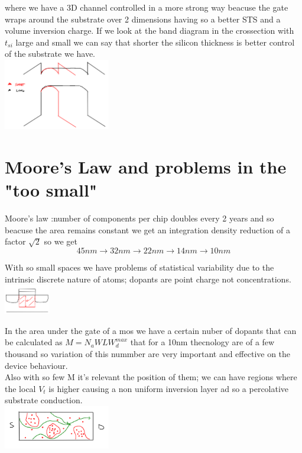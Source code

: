 where we have a 3D channel controlled in a more strong way beacuse the gate wraps around the substrate over 2 dimensions having so a better STS and a volume inversion charge.
If we look at the band diagram in the crossection with $t_{si}$ large and small we can say that shorter the silicon thickness is better control of the substrate we have.\\

\centering
\includegraphics[width=0.35\textwidth]{finfetbd.png}\\
\raggedright

\section{Moore's Law and problems in the "too small"}
Moore's law :number of components per chip doubles every 2 years and so beacuse the area remains constant we get an integration density reduction of a factor $\sqrt{2}$ so we get 
\begin{equation}
45nm \rightarrow 32nm \rightarrow 22nm \rightarrow 14nm \rightarrow 10nm
\end{equation}

\vspace{5mm}
With so small spaces we have problems of statistical variability due to the intrinsic discrete nature of atoms; dopants are point charge not concentrations.\\

\centering
\includegraphics[width=0.15\textwidth]{mosrand.png}\\
\raggedright

In the area under the gate of a mos we have a certain nuber of dopants that can be calculated as $M=N_aWLW_d^{max}$ that for a 10nm thecnology are of a few thousand so variation of this nummber are very important and effective on the device behaviour.\\
Also with so few M it's relevant the position of them; we can have regions where the local $V_t$ is higher causing a non uniform inversion layer ad so a percolative substrate conduction.\\ 


\centering
\includegraphics[width=0.35\textwidth]{percolative.png}\\
\raggedright

